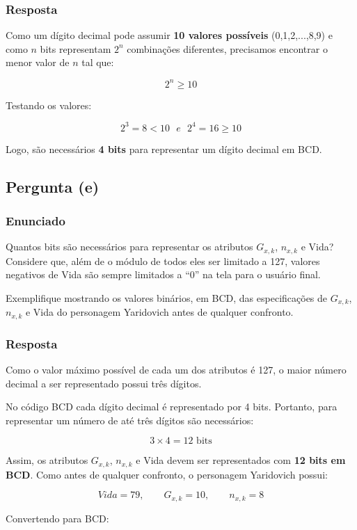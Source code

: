 \documentclass[12pt]{article}
\begin{document}
\subsubsection*{Resposta}
Como um dígito decimal pode assumir \textbf{10 valores possíveis}
(0,1,2,...,8,9) e como $n$ bits representam $2^n$ combinações diferentes, precisamos encontrar o menor valor de $n$ tal que:

\[
2^n \geq 10
\]

Testando os valores:

\[
2^3 = 8 < 10 \ \ \ e \ \ \
2^4 = 16 \geq 10
\]

Logo, são necessários \textbf{4 bits} para representar um dígito decimal em BCD.

\subsection{Pergunta (e)}

\subsubsection*{Enunciado}
Quantos bits são necessários para representar os atributos
$G_{x,k}$, $n_{x,k}$ e Vida? Considere que, além de o módulo de todos eles
ser limitado a 127, valores negativos de Vida são sempre limitados a ``0''
na tela para o usuário final.

Exemplifique mostrando os valores binários, em BCD, das especificações de
$G_{x,k}$, $n_{x,k}$ e Vida do personagem Yaridovich antes de qualquer
confronto.

\subsubsection*{Resposta}
Como o valor máximo possível de cada um dos atributos é 127, o maior número decimal a ser representado possui três dígitos.

No código BCD cada dígito decimal é representado por 4 bits. Portanto,
para representar um número de até três dígitos são necessários:

\[
3 \times 4 = 12 \text{ bits}
\]

Assim, os atributos $G_{x,k}$, $n_{x,k}$ e Vida devem ser representados
com \textbf{12 bits em BCD}. Como antes de qualquer confronto, o personagem Yaridovich possui:

\[
Vida = 79, \qquad G_{x,k} = 10, \qquad n_{x,k} = 8
\]

Convertendo para BCD:
\end{document}
